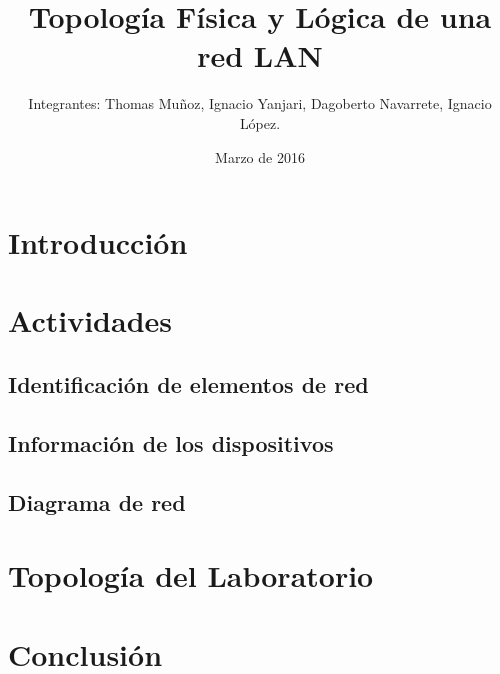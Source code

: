 \documentclass{udpreport}
\title{Topología Física y Lógica de una red LAN}
\author{Integrantes: Thomas Muñoz, Ignacio Yanjari, Dagoberto Navarrete, Ignacio López.}
\date{Marzo de 2016}
\begin{document}
\maketitle
\tableofcontents %
\chapter{Introducción}
\chapter{Actividades}
\section{Identificación de elementos de red}
\section{Información de los dispositivos}
\section{Diagrama de red}
\chapter{Topología del Laboratorio}
\chapter{Conclusión}
\end{document}

